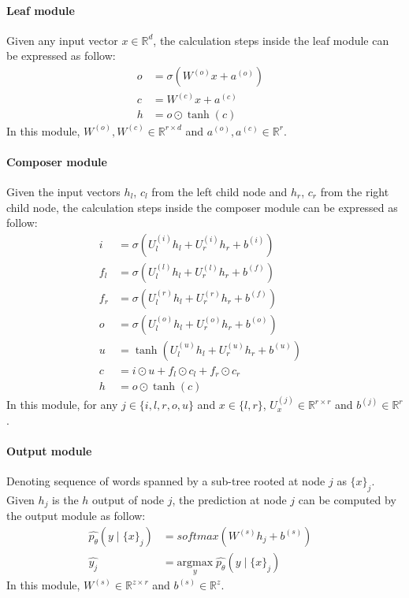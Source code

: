 \paragraph{Leaf module}
Given any input vector \(x \in \mathbb{R}^d\), the calculation steps inside the leaf module can be expressed as follow:
\begin{align}
o &= \sigma{\left( W^{(o)} x + a^{\left(o\right)}\right)} & \\
c &= W^{(c)} x + a^{(c)} & \\
h &= o \odot \tanh{\left(c\right)} &
\end{align}
In this module, \(W^{(o)}, W^{(c)} \in \mathbb{R}^{r \times d}\) and \(a^{\left(o\right)}, a^{(c)} \in \mathbb{R}^r\).
\paragraph{Composer module}
Given the input vectors \({h_l}\), \({c_l}\) from the left child node and \({h_r}\), \({c_r}\) from the right child node, the calculation steps inside the composer module can be expressed as follow:
\begin{align}
i &= \sigma{ \left(U_l^{(i)} h_{l} + U_r^{(i)} h_{r} + b^{(i)} \right) } &\\
f_{l} &= \sigma{\left(U_{l}^{(l)} h_{l} + U_{r}^{(l)} h_{r} + b^{(f)}\right)} & \\
f_{r} &= \sigma{\left(U_{l}^{(r)} h_{l} + U_{r}^{(r)} h_{r} + b^{(f)}\right)} & \\
o &= \sigma{\left( U_l^{(o)} h_{l} + U_r^{(o)} h_{r} + b^{(o)}\right)} &\\
u &= \tanh{\left( U_l^{(u)} h_{l} + U_r^{(u)} h_{r} + b^{(u)}\right)} &\\
c &= i \odot u + f_{l} \odot c_{l} + f_{r} \odot c_{r} & \\
h &= o \odot \tanh{\left(c\right)} &
\end{align}
In this module, for any \(j \in \{i, l, r, o, u\}\) and \(x \in \{l, r\}\), \(U_x^{(j)} \in \mathbb{R}^{r \times r}\) and \( b^{(j)} \in \mathbb{R}^r\).
\paragraph{Output module}
Denoting sequence of words spanned by a sub-tree rooted at node \({j}\) as \({\{x\}_j}\).
Given \({h_j}\) is the \({h}\) output of node \({j}\), the prediction at node \({j}\) can be computed by the output module as follow:
\begin{align}
\hat{p_{\theta}}(y \mid \{x\}_j ) &= softmax( W^{(s)} h_j + b^{(s)}) & \\
\hat{y_j} &= \underset{y}{\mathrm{argmax}} \; \hat{p_{\theta}}(y \mid \{x\}_j ) &
\end{align}
In this module, \(W^{(s)} \in \mathbb{R}^{z \times r}\) and \( b^{(s)} \in \mathbb{R}^z\).
